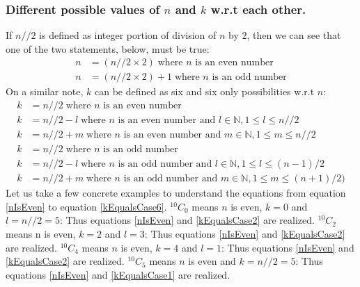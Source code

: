 \documentclass[12pt, twoside]{article}
\newcommand*{\Combination}[2]{{}^{#1}C_{#2}}%
\begin{document}
\subsubsection{Different possible values of $n$ and $k$ w.r.t each other.}
 If $n//2$ is defined as integer portion of division of $n$ by $2$, then we can see that one of the two statements, below, must be true:
 \begin{align}
 	n &= (n//2 \times 2) \; \text{where $n$ is an even number} \label{nIsEven}\\
 	n &= (n//2 \times 2) + 1 \; \text{where $n$ is an odd number} \label{nIsOdd}
 \end{align}
On a similar note, $k$ can be defined as six and six only possibilities w.r.t $n$:
\begin{align}
	k &= n//2 \; \text{where $n$ is an even number }\label{kEqualsCase1}\\
	k &= n//2 - l \; \text{where $n$ is an even number and } l \in \mathbb{N} , 1 \leq l \leq n//2 \label{kEqualsCase2}\\
	k &= n//2 + m \; \text{where $n$ is an even number and } m \in \mathbb{N} , 1 \leq m \leq n//2 \label{kEqualsCase3}\\
	k &= n//2 \; \text{where $n$ is an odd number }\label{kEqualsCase4}\\
	k &= n//2 - l \; \text{where $n$ is an odd number and } l \in \mathbb{N} , 1 \leq l \leq (n-1)/2 \label{kEqualsCase5}\\
	k &= n//2 + m \; \text{where $n$ is an odd number and } m \in \mathbb{N} , 1 \leq m \leq (n+1)/2) \label{kEqualsCase6}		
\end{align}
Let us take a few concrete examples to understand the equations from equation \eqref{nIsEven} to equation \eqref{kEqualsCase6}.\newline\newline
$\Combination{10}{0}$ means $n$ is even, $k = 0$ and $l=n//2=5$: Thus equations \eqref{nIsEven} and \eqref{kEqualsCase2} are realized.\newline
$\Combination{10}{2}$ means n is even, $k = 2$ and $l=3$: Thus equations \eqref{nIsEven} and \eqref{kEqualsCase2} are realized.\newline
$\Combination{10}{4}$ means $n$ is even, $k = 4$ and $l=1$: Thus equations \eqref{nIsEven} and \eqref{kEqualsCase2} are realized.\newline\newline
$\Combination{10}{5}$ means $n$ is even and $k = n//2 = 5$: Thus equations \eqref{nIsEven} and \eqref{kEqualsCase1} are realized.\newline\newline
\end{document}

